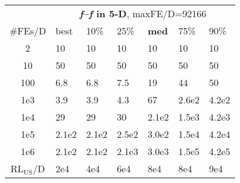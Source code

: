\begin{tabular}{c|llllll}
 & \multicolumn{6}{|c}{\textbf{\textit{f}\raisebox{-0.35ex}{1}--\textit{f}\raisebox{-0.35ex}{5} in 5-D}, maxFE/D=92166}\\
\#FEs/D & best & 10\% & 25\% & \textbf{med} & 75\% & 90\%\\
2 & 10 & 10 & 10 & 10 & 10 & 10\\
10 & 50 & 50 & 50 & 50 & 50 & 50\\
100 & \hspace*{1ex}6.8 & \hspace*{1ex}6.8 & \hspace*{1ex}7.5 & 19 & 44 & 50\\
1e3 & \hspace*{1ex}3.9 & \hspace*{1ex}3.9 & \hspace*{1ex}4.3 & 67 & 2.6e2 & 4.2e2\\
1e4 & 29 & 29 & 30 & 2.1e2 & 1.5e3 & 4.2e3\\
1e5 & 2.1e2 & 2.1e2 & 2.5e2 & 3.0e2 & 1.5e4 & 4.2e4\\
1e6 & 2.1e2 & 2.1e2 & 2.1e3 & 3.0e3 & 1.5e5 & 4.2e5\\
$\text{RL}_{\text{US}}$/D & 2e4 & 4e4 & 6e4 & 8e4 & 8e4 & 9e4
\end{tabular}
